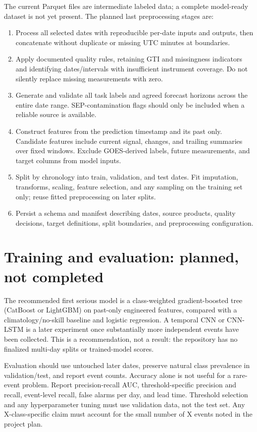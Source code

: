 \documentclass[11pt,a4paper]{article}
\begin{document}
The current Parquet files are intermediate labeled data; a complete model-ready dataset is not yet present. The planned last preprocessing stages are:
\begin{enumerate}
  \item Process all selected dates with reproducible per-date inputs and outputs, then concatenate without duplicate or missing UTC minutes at boundaries.
  \item Apply documented quality rules, retaining GTI and missingness indicators and identifying dates/intervals with insufficient instrument coverage. Do not silently replace missing measurements with zero.
  \item Generate and validate all task labels and agreed forecast horizons across the entire date range. SEP-contamination flags should only be included when a reliable source is available.
  \item Construct features from the prediction timestamp and its past only. Candidate features include current signal, changes, and trailing summaries over fixed windows. Exclude GOES-derived labels, future measurements, and target columns from model inputs.
  \item Split by chronology into train, validation, and test dates. Fit imputation, transforms, scaling, feature selection, and any sampling on the training set only; reuse fitted preprocessing on later splits.
  \item Persist a schema and manifest describing dates, source products, quality decisions, target definitions, split boundaries, and preprocessing configuration.
\end{enumerate}

\section{Training and evaluation: planned, not completed}

The recommended first serious model is a class-weighted gradient-boosted tree (CatBoost or LightGBM) on past-only engineered features, compared with a climatology/no-skill baseline and logistic regression. A temporal CNN or CNN-LSTM is a later experiment once substantially more independent events have been collected. This is a recommendation, not a result: the repository has no finalized multi-day splits or trained-model scores.

Evaluation should use untouched later dates, preserve natural class prevalence in validation/test, and report event counts. Accuracy alone is not useful for a rare-event problem. Report precision-recall AUC, threshold-specific precision and recall, event-level recall, false alarms per day, and lead time. Threshold selection and any hyperparameter tuning must use validation data, not the test set. Any X-class-specific claim must account for the small number of X events noted in the project plan.
\end{document}
